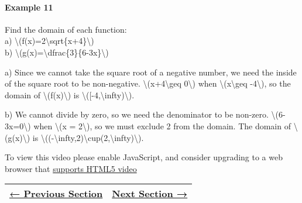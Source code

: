 \hypertarget{example-11}{%
\paragraph{Example 11}\label{example-11}}

Find the domain of each function:\\
a) \textbackslash{}(f(x)=2\textbackslash{}sqrt\{x+4\}\textbackslash{})\\
b)
\textbackslash{}(g(x)=\textbackslash{}dfrac\{3\}\{6-3x\}\textbackslash{})

a) Since we cannot take the square root of a negative number, we need
the inside of the square root to be non-negative.
\textbackslash{}(x+4\textbackslash{}geq 0\textbackslash{}) when
\textbackslash{}(x\textbackslash{}geq -4\textbackslash{}), so the domain
of \textbackslash{}(f(x)\textbackslash{}) is
\textbackslash{}({[}-4,\textbackslash{}infty)\textbackslash{}).

b) We cannot divide by zero, so we need the denominator to be non-zero.
\textbackslash{}(6-3x=0\textbackslash{}) when \textbackslash{}(x =
2\textbackslash{}), so we must exclude 2 from the domain. The domain of
\textbackslash{}(g(x)\textbackslash{}) is
\textbackslash{}((-\textbackslash{}infty,2)\textbackslash{}cup(2,\textbackslash{}infty)\textbackslash{}).

To view this video please enable JavaScript, and consider upgrading to a
web browser that \href{http://videojs.com/html5-video-support/}{supports
HTML5 video}

\begin{longtable}[]{@{}ll@{}}
\toprule
\endhead
\href{../index.php}{← Previous Section} & \href{section1-2.php}{Next
Section →}\tabularnewline
\bottomrule
\end{longtable}
